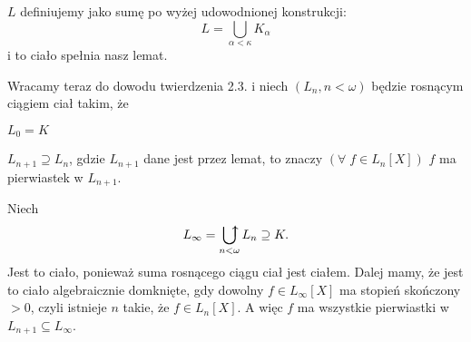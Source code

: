 $L$ definiujemy jako sumę po wyżej udowodnionej konstrukcji:
$$L=\bigcup\limits_{\alpha<\kappa}K_\alpha$$
i to ciało spełnia nasz lemat.
\smallskip

Wracamy teraz do dowodu twierdzenia 2.3. i niech $(L_n,n<\omega)$ będzie rosnącym ciągiem ciał takim, że

\indent \point $L_0=K$

\indent \point $L_{n+1}\supseteq L_n$, gdzie $L_{n+1}$ dane jest przez lemat, to znaczy $(\forall\;f\in L_n[X])$ $f$ ma pierwiastek w $L_{n+1}$.

Niech
$$L_\infty=\ubigcup\limits_{n<\omega}L_n\supseteq K.$$
Jest to ciało, ponieważ suma rosnącego ciągu ciał jest ciałem. Dalej mamy, że jest to ciało algebraicznie domknięte, gdy dowolny $f\in L_\infty [X]$ ma stopień skończony $>0$, czyli istnieje $n$ takie, że $f\in L_n[X]$. A więc $f$ ma wszystkie pierwiastki w $L_{n+1}\subseteq L_\infty$.

